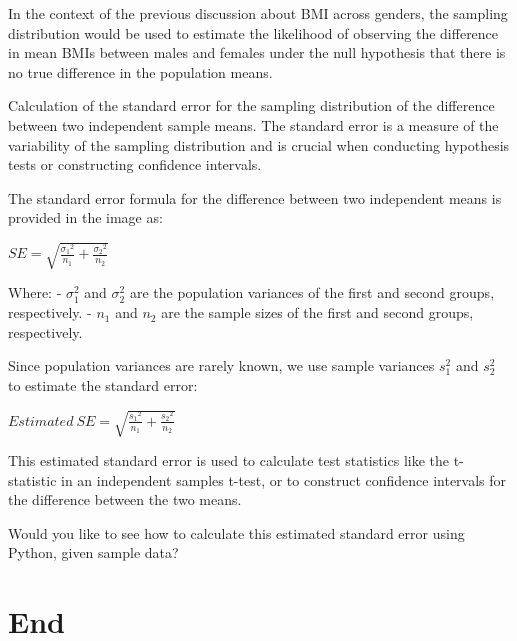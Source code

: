 \documentclass[
  letterpaper,
  DIV=11,
  numbers=noendperiod]{scrartcl}
\begin{document}
In the context of the previous discussion about BMI across genders, the
sampling distribution would be used to estimate the likelihood of
observing the difference in mean BMIs between males and females under
the null hypothesis that there is no true difference in the population
means.

Calculation of the standard error for the sampling distribution of the
difference between two independent sample means. The standard error is a
measure of the variability of the sampling distribution and is crucial
when conducting hypothesis tests or constructing confidence intervals.

The standard error formula for the difference between two independent
means is provided in the image as:

\(SE = \sqrt{\frac{{\sigma_1}^2}{n_1} + \frac{{\sigma_2}^2}{n_2}}\)

Where: - \(\sigma_1^2\) and \(\sigma_2^2\) are the population variances
of the first and second groups, respectively. - \(n_1\) and \(n_2\) are
the sample sizes of the first and second groups, respectively.

Since population variances are rarely known, we use sample variances
\(s_1^2\) and \(s_2^2\) to estimate the standard error:

\(Estimated\:SE = \sqrt{\frac{{s_1}^2}{n_1} + \frac{{s_2}^2}{n_2}}\)

This estimated standard error is used to calculate test statistics like
the t-statistic in an independent samples t-test, or to construct
confidence intervals for the difference between the two means.

Would you like to see how to calculate this estimated standard error
using Python, given sample data?

\hypertarget{end}{%
\section{End}\label{end}}
\end{document}
